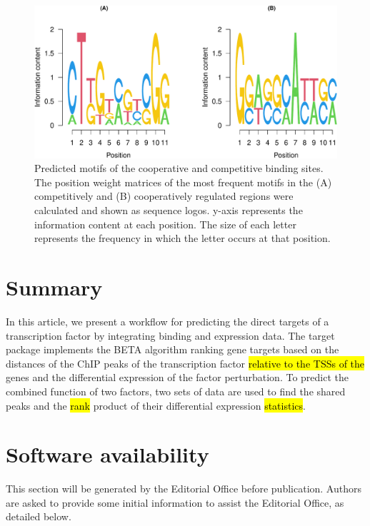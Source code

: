 \documentclass[9pt,a4paper,]{extarticle}
\begin{document}
\begin{figure}

{\centering \includegraphics[width=1\linewidth]{targetFlow_files/figure-latex/motifs-1} 

}

\caption{Predicted motifs of the cooperative and competitive binding sites. The position weight matrices of the most frequent motifs in the (A) competitively and (B) cooperatively regulated regions were calculated and shown as sequence logos. y-axis represents the information content at each position. The size of each letter represents the frequency in which the letter occurs at that position.}\label{fig:motifs}
\end{figure}

\hypertarget{summary}{%
\section{Summary}\label{summary}}

In this article, we present a workflow for predicting the direct targets of a transcription factor by integrating binding and expression data. The target package implements the BETA algorithm ranking gene targets based on the distances of the ChIP peaks of the transcription factor \hl{relative to the TSSs of the} genes and the differential expression of the factor perturbation. To predict the combined function of two factors, two sets of data are used to find the shared peaks and the \hl{rank} product of their differential expression \hl{statistics}.

\hypertarget{software-availability}{%
\section{Software availability}\label{software-availability}}

This section will be generated by the Editorial Office before publication. Authors are asked to provide some initial information to assist the Editorial Office, as detailed below.
\end{document}
